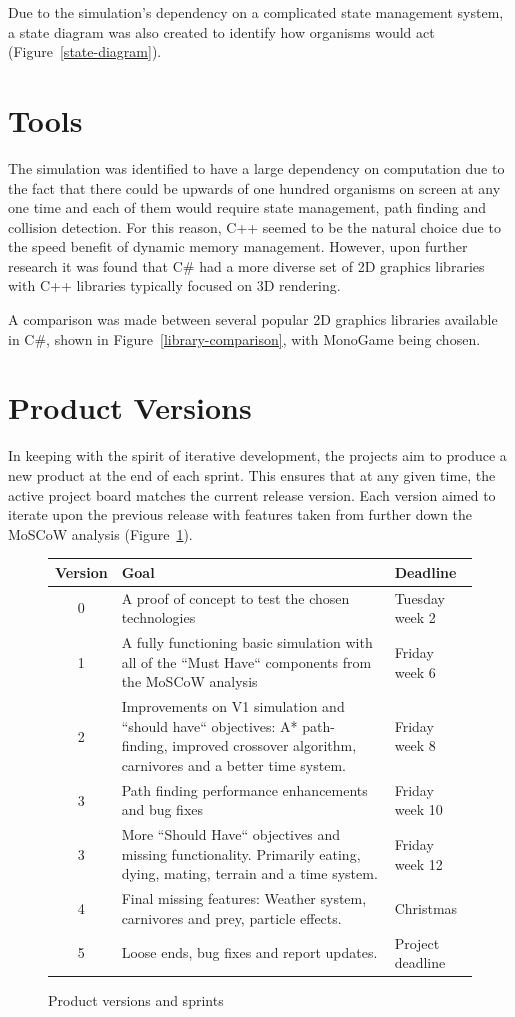 \documentclass[a4paper, oneside, 11pt]{report}
\begin{document}
Due to the simulation's dependency on a complicated state management system, a state diagram was also created to identify how organisms would act (Figure~\ref{state-diagram}).
\section{Tools}\label{tools}
The simulation was identified to have a large dependency on computation due to the fact that there could be upwards of one hundred organisms on screen at any one time and each of them would require state management, path finding and collision detection. For this reason, C++ seemed to be the natural choice due to the speed benefit of dynamic memory management. However, upon further research it was found that C\# had a more diverse set of 2D graphics libraries with C++ libraries typically focused on 3D rendering.

A comparison was made between several popular 2D graphics libraries available in C\#, shown in Figure~\ref{library-comparison}, with MonoGame being chosen.

\section{Product Versions}\label{versioning}
In keeping with the spirit of iterative development, the projects aim to produce a new product at the end of each sprint. This ensures that at any given time, the active project board matches the current release version. Each version aimed to iterate upon the previous release with features taken from further down the MoSCoW analysis (Figure~\ref{version-table}).

\smallskip 
\begin{figure}[H]
	\caption{Product versions and sprints} \label{version-table}
	\centering
	\begin{tabular}{c|p{}|l}
		Version & Goal & Deadline \\ \hline
		0 & A proof of concept to test the chosen technologies & Tuesday week 2 \\ \hline
		1 & A fully functioning basic simulation with all of the ``Must Have`` components from the MoSCoW analysis & Friday week 6 \\ \hline
		2 & Improvements on V1 simulation and ``should have`` objectives: A* path-finding, improved crossover algorithm, carnivores and a better time system. & Friday week 8 \\ \hline
		3 & Path finding performance enhancements and bug fixes & Friday week 10 \\ \hline
		3 & More ``Should Have`` objectives and missing functionality. Primarily eating, dying, mating, terrain and a time system. & Friday week 12 \\ \hline
		4 & Final missing features: Weather system, carnivores and prey, particle effects. & Christmas \\ \hline
		5 & Loose ends, bug fixes and report updates. & Project deadline \\ \hline
	\end{tabular}
\end{figure}
\smallskip 
\end{document}
